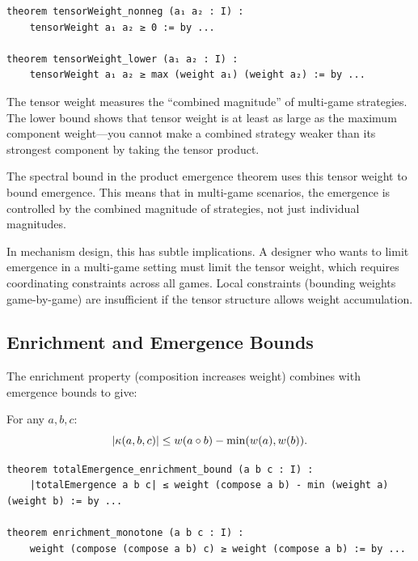 \begin{lstlisting}[caption={Tensor weight properties (IDT\_v3\_Emergence.lean)}]
theorem tensorWeight_nonneg (a₁ a₂ : I) :
    tensorWeight a₁ a₂ ≥ 0 := by ...

theorem tensorWeight_lower (a₁ a₂ : I) :
    tensorWeight a₁ a₂ ≥ max (weight a₁) (weight a₂) := by ...
\end{lstlisting}

\begin{interpretation}
The tensor weight measures the ``combined magnitude'' of multi-game strategies.
The lower bound shows that tensor weight is at least as large as the maximum
component weight---you cannot make a combined strategy weaker than its strongest
component by taking the tensor product.

The spectral bound in the product emergence theorem uses this tensor weight to
bound emergence. This means that in multi-game scenarios, the emergence is
controlled by the combined magnitude of strategies, not just individual magnitudes.

In mechanism design, this has subtle implications. A designer who wants to limit
emergence in a multi-game setting must limit the tensor weight, which requires
coordinating constraints across all games. Local constraints (bounding weights
game-by-game) are insufficient if the tensor structure allows weight accumulation.
\end{interpretation}

\subsection{Enrichment and Emergence Bounds}

The enrichment property (composition increases weight) combines with emergence
bounds to give:

\begin{theorem}
\label{thm:enrichment-emergence-bound}
For any $a, b, c$:
\[
  |\kappa(a, b, c)| \leq w(a \circ b) - \min(w(a), w(b)).
\]
\end{theorem}

\begin{lstlisting}[caption={Enrichment constrains emergence (IDT\_v3\_Emergence.lean)}]
theorem totalEmergence_enrichment_bound (a b c : I) :
    |totalEmergence a b c| ≤ weight (compose a b) - min (weight a) (weight b) := by ...
    
theorem enrichment_monotone (a b c : I) :
    weight (compose (compose a b) c) ≥ weight (compose a b) := by ...
\end{lstlisting}

